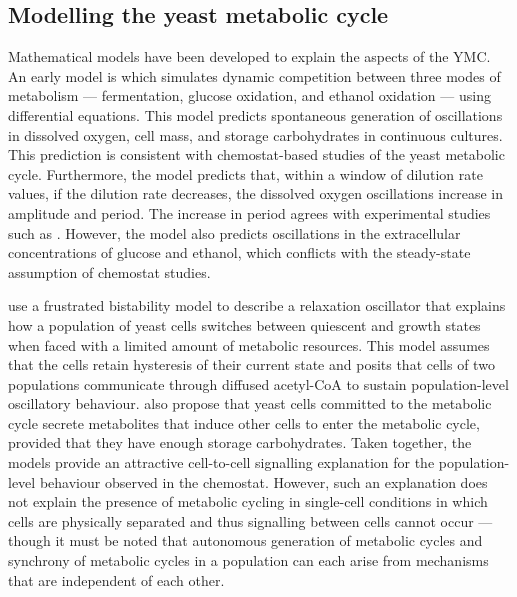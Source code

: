 \subsection{Modelling the yeast metabolic cycle}
\label{subsec:intro-ymc-model}


Mathematical models have been developed to explain the aspects of the YMC.
An early model is \textcite{jonesCyberneticModelGrowth1999} which simulates dynamic competition between three modes of metabolism --- fermentation, glucose oxidation, and ethanol oxidation --- using differential equations.
This model predicts spontaneous generation of oscillations in dissolved oxygen, cell mass, and storage carbohydrates in continuous cultures.
This prediction is consistent with chemostat-based studies of the yeast metabolic cycle.
Furthermore, the model predicts that, within a window of dilution rate values, if the dilution rate decreases, the dissolved oxygen oscillations increase in amplitude and period.
The increase in period agrees with experimental studies such as \textcite{oneillEukaryoticCellBiology2020}.
However, the model also predicts oscillations in the extracellular concentrations of glucose and ethanol, which conflicts with the steady-state assumption of chemostat studies.

\textcite{krishnaMinimalPushPull2018} use a frustrated bistability model to describe a relaxation oscillator that explains how a population of yeast cells switches between quiescent and growth states when faced with a limited amount of metabolic resources.
This model assumes that the cells retain hysteresis of their current state and posits that cells of two populations communicate through diffused acetyl-CoA to sustain population-level oscillatory behaviour.
\textcite{burnettiCellCycleStart2016} also propose that yeast cells committed to the metabolic cycle secrete metabolites that induce other cells to enter the metabolic cycle, provided that they have enough storage carbohydrates.
Taken together, the models provide an attractive cell-to-cell signalling explanation for the population-level behaviour observed in the chemostat.
However, such an explanation does not explain the presence of metabolic cycling in single-cell conditions in which cells are physically separated and thus signalling between cells cannot occur --- though it must be noted that autonomous generation of metabolic cycles and synchrony of metabolic cycles in a population can each arise from mechanisms that are independent of each other.

